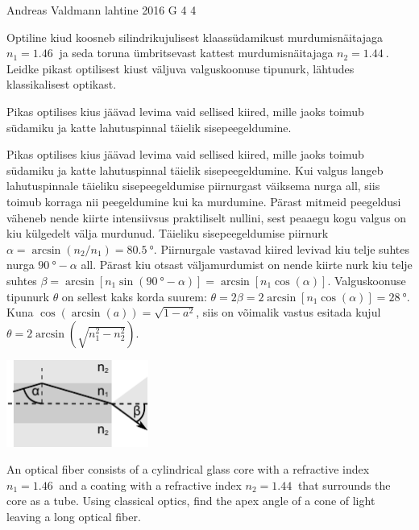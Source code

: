 {Andreas Valdmann} %
{lahtine} %
{2016} %
{G 4} %
{4} %
{
\ifStatement
Optiline kiud koosneb silindrikujulisest klaassüdamikust murdumisnäitajaga $n_1=\SI{1,46}{}$ ja seda toruna ümbritsevast kattest murdumisnäitajaga $n_2=\SI{1,44}{}$. Leidke pikast optilisest kiust väljuva valguskoonuse tipunurk, lähtudes klassikalisest optikast.
\fi


\ifHint
Pikas optilises kius jäävad levima vaid sellised kiired, mille jaoks toimub südamiku ja katte lahutuspinnal täielik sisepeegeldumine.
\fi


\ifSolution
Pikas optilises kius jäävad levima vaid sellised kiired, mille jaoks toimub südamiku ja katte lahutuspinnal täielik sisepeegeldumine. Kui valgus langeb lahutuspinnale täieliku sisepeegeldumise piirnurgast väiksema nurga all, siis toimub korraga nii peegeldumine kui ka murdumine. Pärast mitmeid peegeldusi väheneb nende kiirte intensiivsus praktiliselt nullini, sest peaaegu kogu valgus on kiu külgedelt välja murdunud. Täieliku sisepeegeldumise piirnurk $\alpha=\arcsin(n_2/n_1)=\SI{80,5}{\degree}$. Piirnurgale vastavad kiired levivad kiu telje suhtes nurga $\SI{90}{\degree}-\alpha$ all. Pärast kiu otsast väljamurdumist on nende kiirte nurk kiu telje suhtes $\beta=\arcsin[n_1\sin(\SI{90}{\degree}-\alpha)]=\arcsin[n_1\cos(\alpha)]$. Valguskoonuse tipunurk $\theta$ on sellest kaks korda suurem: $\theta=2\beta=2\arcsin[n_1\cos(\alpha)]=\SI{28}{\degree}$. Kuna $\cos(\arcsin(a))=\sqrt{1-a^2}$, siis on võimalik vastus esitada kujul $\theta=2\arcsin(\sqrt{n_1^2-n_2^2})$.

\begin{center}
    \includegraphics[width=0.35\textwidth]{2016-lahg-04-kiud}
\end{center}
\fi


\ifEngStatement
An optical fiber consists of a cylindrical glass core with a refractive index $n_1=\SI{1,46}{}$ and a coating with a refractive index $n_2=\SI{1,44}{}$ that surrounds the core as a tube. Using classical optics, find the apex angle of a cone of light leaving a long optical fiber.
\fi


}
